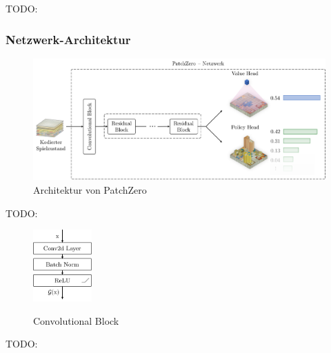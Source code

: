 TODO:

\pagebreak

\subsubsection*{Netzwerk-Architektur}

\cite{2018.Lc0AlphaZero}
\cite{2019.SqueezeandExcitation}
\cite{2020.Lc0NetworkTopology}

\begin{figure}[!ht]
    \centering
    \includegraphics[width=\textwidth]{res/pictures/patch-zero-architecture.pdf}
    \caption{Architektur von PatchZero}
    \label{fig:patch-zero-architecture}
\end{figure}

TODO:

\begin{figure}
    \includegraphics[width=0.2\textwidth]{res/pictures/conv-block.pdf}
    \centering
    \caption[Convolutional Block]{\unskip}
    Convolutional Block
    \label{fig:conv-block}
\end{figure}

TODO:

